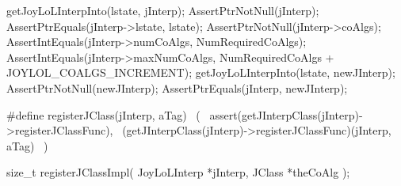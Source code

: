 
\startCTest
  getJoyLoLInterpInto(lstate, jInterp);
  AssertPtrNotNull(jInterp);
  AssertPtrEquals(jInterp->lstate, lstate);
  AssertPtrNotNull(jInterp->coAlgs);
  AssertIntEquals(jInterp->numCoAlgs, NumRequiredCoAlgs);
  AssertIntEquals(jInterp->maxNumCoAlgs,
    NumRequiredCoAlgs + JOYLOL_COALGS_INCREMENT);
  getJoyLoLInterpInto(lstate, newJInterp);
  AssertPtrNotNull(newJInterp);
  AssertPtrEquals(jInterp, newJInterp);
\stopCTest
\stopTestCase
\stopTestSuite

\startTestSuite[registerCoAlgebra]

\startCHeader
#define registerJClass(jInterp, aTag)                              \
  (                                                                    \
    assert(getJInterpClass(jInterp)->registerJClassFunc),          \
    (getJInterpClass(jInterp)->registerJClassFunc)(jInterp, aTag)  \
  )
\stopCHeader

\setCHeaderStream{private}
\startCHeader
size_t registerJClassImpl(
  JoyLoLInterp *jInterp,
  JClass *theCoAlg
);
\stopCHeader
{}

